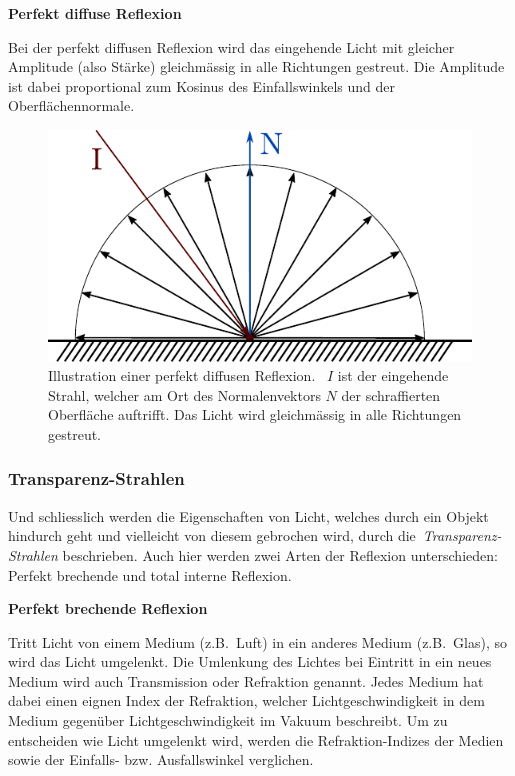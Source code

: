 \textbf{Perfekt diffuse Reflexion}

Bei der perfekt diffusen Reflexion wird das eingehende Licht mit
gleicher Amplitude (also Stärke) gleichmässig in alle Richtungen
gestreut. Die Amplitude ist dabei proportional zum Kosinus des
Einfallswinkels und der Oberflächennormale.

\begin{figure}[H]\label{fig:ray_tracing_diffuse_reflection}
    \centering
    \includegraphics{img/perfect_diffuse_reflection.pdf}
    \caption{Illustration einer perfekt diffusen
        Reflexion.~\protect\footnotemark{}
        $I$ ist der eingehende Strahl, welcher am Ort des
        Normalenvektors $N$ der schraffierten Oberfläche auftrifft. Das
        Licht wird gleichmässig in alle Richtungen gestreut.}
\end{figure}

\subsubsection{Transparenz-Strahlen}
\label{ssubsec:ray_tracing:transparency_rays}

Und schliesslich werden die Eigenschaften von Licht, welches durch ein
Objekt hindurch geht und vielleicht von diesem gebrochen wird, durch
die~\textit{Transparenz-Strahlen} beschrieben.  Auch hier werden zwei
Arten der Reflexion unterschieden: Perfekt brechende und total interne
Reflexion.

\textbf{Perfekt brechende Reflexion}

Tritt Licht von einem Medium (z.B.\ Luft) in ein anderes Medium (z.B.\
Glas), so wird das Licht umgelenkt. Die Umlenkung des Lichtes bei
Eintritt in ein neues Medium wird auch Transmission oder Refraktion
genannt. Jedes Medium hat dabei einen eignen Index der Refraktion,
welcher Lichtgeschwindigkeit in dem Medium gegenüber
Lichtgeschwindigkeit im Vakuum beschreibt.
Um zu entscheiden wie Licht umgelenkt wird, werden die
Refraktion-Indizes der Medien sowie der Einfalls- bzw. Ausfallswinkel
verglichen.

